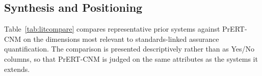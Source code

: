 \documentclass[final,3p,times,twocolumn]{elsarticle}
\begin{document}
	\subsection{Synthesis and Positioning}
	Table~\ref{tab:litcompare} compares representative prior systems against PrERT-CNM
	on the dimensions most relevant to standards-linked assurance quantification. The
	comparison is presented descriptively rather than as Yes/No columns, so that
	PrERT-CNM is judged on the same attributes as the systems it extends.
    \onecolumn
    \begin{table}
		[ht]
		\centering
		\caption{Descriptive comparison of representative privacy-analysis and
		privacy-quantification approaches against PrERT-CNM.}
		\label{tab:litcompare} \scriptsize
		\setlength{\tabcolsep}{5pt}
		\renewcommand{\arraystretch}{1}
		

\end{table}
\end{document}
